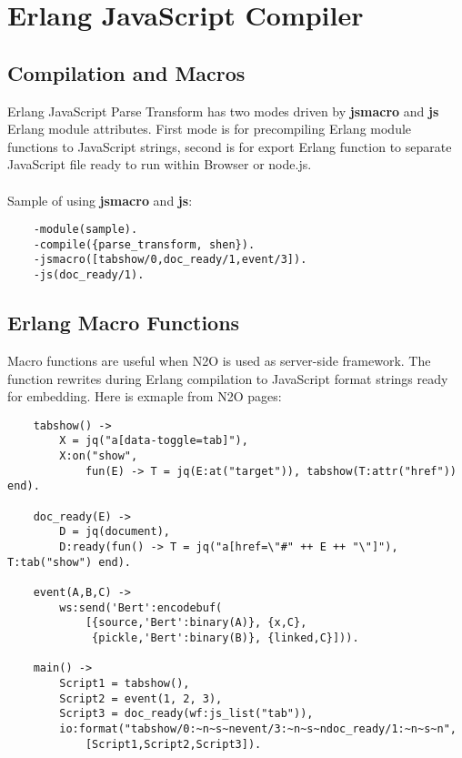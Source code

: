 \section{Erlang JavaScript Compiler}

\subsection{Compilation and Macros}
Erlang JavaScript Parse Transform has two modes driven
by {\bf \-jsmacro} and {\bf \-js} Erlang module attributes.
First mode is for precompiling Erlang module functions
to JavaScript strings, second is for export Erlang function
to separate JavaScript file ready to run within Browser or node.js.

\paragraph{}
Sample of using {\bf \-jsmacro} and {\bf \-js}:

\vspace{1\baselineskip}
\begin{lstlisting}
    -module(sample).
    -compile({parse_transform, shen}).
    -jsmacro([tabshow/0,doc_ready/1,event/3]).
    -js(doc_ready/1).
\end{lstlisting}

\subsection{Erlang Macro Functions}
Macro functions are useful when N2O is used as server-side framework.
The function rewrites during Erlang compilation to JavaScript format
strings ready for embedding. Here is exmaple from N2O pages:

\begin{lstlisting}
    tabshow() ->
        X = jq("a[data-toggle=tab]"),
        X:on("show", 
            fun(E) -> T = jq(E:at("target")), tabshow(T:attr("href")) end).

    doc_ready(E) ->
        D = jq(document),
        D:ready(fun() -> T = jq("a[href=\"#" ++ E ++ "\"]"), T:tab("show") end).

    event(A,B,C) ->
        ws:send('Bert':encodebuf(
            [{source,'Bert':binary(A)}, {x,C},
             {pickle,'Bert':binary(B)}, {linked,C}])).

    main() ->
        Script1 = tabshow(),
        Script2 = event(1, 2, 3),
        Script3 = doc_ready(wf:js_list("tab")),
        io:format("tabshow/0:~n~s~nevent/3:~n~s~ndoc_ready/1:~n~s~n",
            [Script1,Script2,Script3]).
\end{lstlisting}
\vspace{1\baselineskip}


